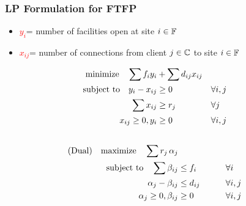 \documentclass[hyperref,dvipsnames,svgnames]{beamer}
\begin{document}


\begin{frame}
  \frametitle{LP Formulation for FTFP}
  \begin{itemize}
  \item \textcolor{red}{$y_i$}=   number of facilities open at site $i\in \mathbb{F}$
  \item \textcolor{red}{$x_{ij}$}= number of connections from client $j\in
    \mathbb{C}$ to site $i \in \mathbb{F}$
  \end{itemize}
  \begin{alignat}{3}
    \textrm{minimize}\quad \sum f_iy_i &+ \sum d_{ij}x_{ij}&
    \\ \notag
    \textrm{subject to}\quad y_i - x_{ij} &\geq 0  & &\forall i,j
    \\ \notag
    \sum x_{ij} &\geq r_j & &\forall j
    \\ \notag
    x_{ij} \geq 0, y_i &\geq 0 & &\forall i,j
    \\ \notag
  \end{alignat}
  \begin{alignat}{3}
  \text{(Dual)}\quad  \textrm{maximize}\quad \sum r_j\, \alpha_j&
    \\ \notag
    \textrm{subject to} \quad 
      \sum \beta_{ij} &\leq f_i  &\quad\quad			&\forall i
    \\ \notag
    \alpha_{j} - \beta_{ij} 	&\leq  d_{ij}       &                 & \forall i,j
    \\ \notag
    \alpha_j \geq 0, \beta_{ij} &\geq 0           &            & \forall i,j
  \end{alignat}
\end{frame}

\end{document}
